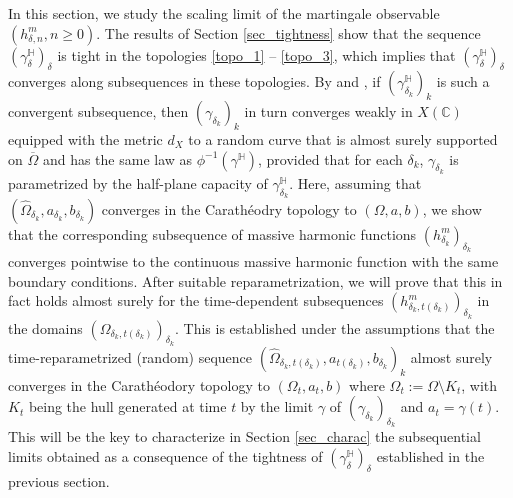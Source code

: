 \documentclass{article}
\newcommand{\HH}{{\mathbb{H}}}
\theoremstyle{definition}
\theoremstyle{remark}
\theoremstyle{remark}
\begin{document}
In this section, we study the scaling limit of the martingale observable $(h_{\delta,n}^m, n \geq 0)$. The results of Section \ref{sec_tightness} show that the sequence $(\gamma_{\delta}^{\HH})_{\delta}$ is tight in the topologies \eqref{topo_1} -- \eqref{topo_3}, which implies that $(\gamma_{\delta}^{\HH})_{\delta}$ converges along subsequences in these topologies. By \cite[Corollary~1.8]{Smirnov} and \cite[Theorem~4.2]{Karrila}, if $(\gamma_{\delta_k}^{\HH})_{k}$ is such a convergent subsequence, then $(\gamma_{\delta_k})_k$ in turn converges weakly in $X(\mathbb{C})$ equipped with the metric $d_X$ to a random curve that is almost surely supported on $\overline{\Omega}$ and has the same law as $\phi^{-1}(\gamma^{\HH})$, provided that for each $\delta_k$, $\gamma_{\delta_k}$ is parametrized by the half-plane capacity of $\gamma_{\delta_k}^{\HH}$. Here, assuming that $(\hat \Omega_{\delta_k}, a_{\delta_k}, b_{\delta_k})$ converges in the Carath\'eodry topology to $(\Omega,a,b)$, we show that the corresponding subsequence of massive harmonic functions $(h_{\delta_k}^m)_{\delta_k}$ converges pointwise to the continuous massive harmonic function with the same boundary conditions. After suitable reparametrization, we will prove that this in fact holds almost surely for the time-dependent subsequences $(h_{\delta_k, t(\delta_k)}^m)_{\delta_k}$ in the domains $(\Omega_{\delta_k,t(\delta_k)})_{\delta_k}$. This is established under the assumptions that the time-reparametrized (random) sequence $(\hat \Omega_{\delta_k, t(\delta_k)}, a_{t(\delta_k)}, b_{\delta_k})_k$ almost surely converges in the Carath\'eodory topology to $(\Omega_t, a_t, b)$ where $\Omega_t := \Omega \setminus K_t$, with $K_t$ being the hull generated at time $t$ by the limit $\gamma$ of $(\gamma_{\delta_k})_{\delta_k}$ and $a_t=\gamma(t)$. This will be the key to characterize in Section \ref{sec_charac} the subsequential limits obtained as a consequence of the tightness of $(\gamma_{\delta}^{\HH})_{\delta}$ established in the previous section.
\end{document}

